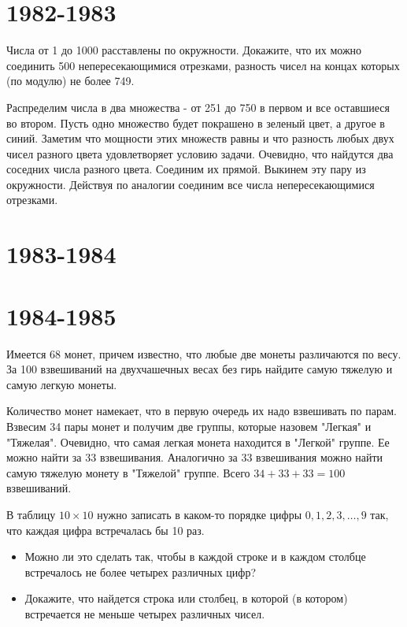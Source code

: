 \documentclass[11pt, a4paper]{template}
\begin{document}
\chapter{1982-1983}

\begin{exercise}
Числа от 1 до 1000 расставлены по окружности. Докажите, что их можно соединить 500 непересекающимися отрезками, разность чисел на концах которых (по модулю) не более 749.
\end{exercise}

\begin{solution}
Распределим числа в два множества - от 251 до 750 в первом и все оставшиеся во втором. Пусть одно множество будет покрашено в зеленый цвет, а другое в синий. Заметим что мощности этих множеств равны и что разность любых двух чисел разного цвета удовлетворяет условию задачи. Очевидно, что найдутся два соседних числа разного цвета. Соединим их прямой. Выкинем эту пару из окружности. Действуя по аналогии соединим все числа непересекающимися отрезками. 
\end{solution}

\chapter{1983-1984}

\chapter{1984-1985}

\begin{exercise}
Имеется 68 монет, причем известно, что любые две монеты различаются по весу. За 100 взвешиваний на \newline двухчашечных весах без гирь найдите самую тяжелую и самую легкую монеты.
\end{exercise}

\begin{solution}
Количество монет намекает, что в первую очередь их надо взвешивать по парам. Взвесим 34 пары монет и получим две группы, которые назовем "Легкая" и "Тяжелая". Очевидно, что самая легкая монета находится в "Легкой" группе. Ее можно найти за 33 взвешивания. Аналогично за 33 взвешивания можно найти самую тяжелую монету в "Тяжелой" группе. Всего $34 + 33 + 33 = 100$ взвешиваний.
\end{solution}

\begin{exercise}
В таблицу $10 \times 10$ нужно записать в каком-то порядке цифры $0, 1, 2, 3, \dots, 9$ так, что каждая цифра встречалась бы 10 раз.
\begin{itemize}
\item Можно ли это сделать так, чтобы в каждой строке и в каждом столбце встречалось не более четырех различных цифр?
\item Докажите, что найдется строка или столбец, в которой (в котором) встречается не меньше четырех различных чисел.
\end{itemize}
\end{exercise}
\end{document}
